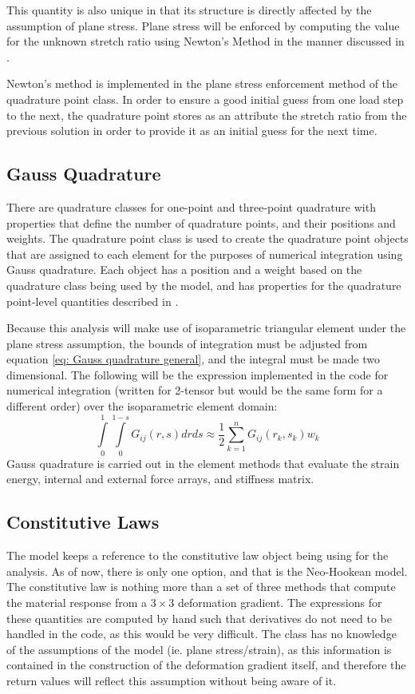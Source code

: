 \documentclass[]{spie}  %
\begin{document}
This quantity is also unique in that its structure is directly affected by the assumption of plane stress. Plane stress will be enforced by computing the value for the unknown stretch ratio using Newton's Method in the manner discussed in \textit{}. 

Newton's method is implemented in the plane stress enforcement method of the quadrature point class. In order to ensure a good initial guess from one load step to the next, the quadrature point stores as an attribute the stretch ratio from the previous solution in order to provide it as an initial guess for the next time. 

\subsection{Gauss Quadrature}
There are quadrature classes for one-point and three-point quadrature with properties that define the number of quadrature points, and their positions and weights. The quadrature point class is used to create the quadrature point objects that are assigned to each element for the purposes of numerical integration using Gauss quadrature. Each object has a position and a weight based on the quadrature class being used by the model, and has properties for the quadrature point-level quantities described in \textit{}. 

Because this analysis will make use of isoparametric triangular element under the plane stress assumption, the bounds of integration must be adjusted from equation \ref{eq: Gauss quadrature general}, and the integral must be made two dimensional. The following will be the expression implemented in the code for numerical integration (written for 2-tensor but would be the same form for a different order) over the isoparametric element domain:
\begin{equation}
\label{eq: Gauss quadrature}
\int\limits_{0}^{1} \int\limits_{0}^{1-s} G_{ij}(r,s)dr ds \approx \frac{1}{2} \sum\limits_{k=1}^{n} G_{ij}(r_k,s_k) w_k
\end{equation}
Gauss quadrature is carried out in the element methods that evaluate the strain energy, internal and external force arrays, and stiffness matrix.

\subsection{Constitutive Laws}
The model keeps a reference to the constitutive law object being using for the analysis. As of now, there is only one option, and that is the Neo-Hookean model. The constitutive law is nothing more than a set of three methods that compute the material response from a $3 \times 3$ deformation gradient. The expressions for these quantities are computed by hand such that derivatives do not need to be handled in the code, as this would be very difficult. The class has no knowledge of the assumptions of the model (ie. plane stress/strain), as this information is contained in the construction of the deformation gradient itself, and therefore the return values will reflect this assumption without being aware of it. 
\end{document}
